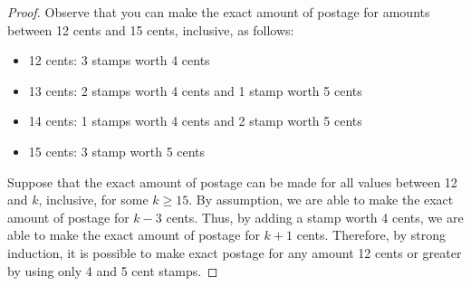 \documentclass[class=article, crop=false]{standalone}
\begin{document}
  \begin{proof}
    Observe that you can make the exact amount of postage for amounts between 12 cents and 15 cents, inclusive, as follows:
    \begin{itemize}
      \item 12 cents: 3 stamps worth 4 cents
      \item 13 cents: 2 stamps worth 4 cents and 1 stamp worth 5 cents
      \item 14 cents: 1 stamps worth 4 cents and 2 stamp worth 5 cents
      \item 15 cents: 3 stamp worth 5 cents
    \end{itemize}
    Suppose that the exact amount of postage can be made for all values between 12 and $k$, inclusive, for some $k \geq 15$. By assumption, we are able to make the exact amount of postage for $k - 3$ cents. Thus, by adding a stamp worth 4 cents, we are able to make the exact amount of postage for $k + 1$ cents. Therefore, by strong induction, it is possible to make exact postage for any amount 12 cents or greater by using only 4 and 5 cent stamps.
  \end{proof}
\end{document}
